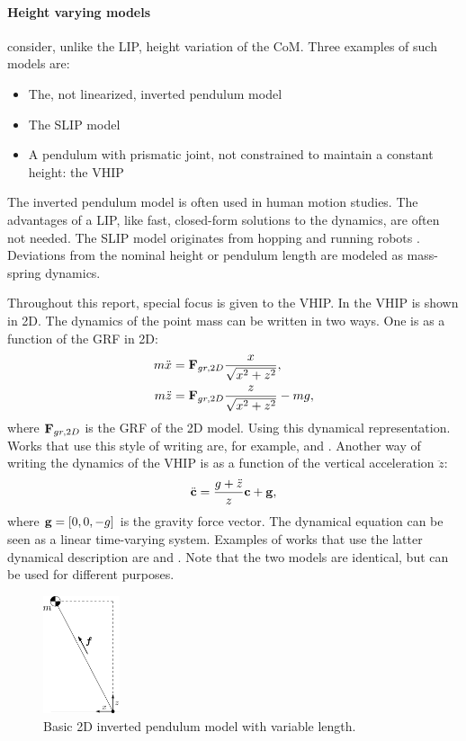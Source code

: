 \paragraph{Height varying models} consider, unlike the \ac{LIP}, height variation of the \ac{CoM}. Three examples of such models are:
\begin{itemize}
	\item The, not linearized, inverted pendulum model \cite{kuo2005energetic}
	\item The \ac{SLIP} model \cite{liu2015trajectory}
	\item A pendulum with prismatic joint, not constrained to maintain a constant height: the \ac{VHIP} \cite{pratt2007derivation}
\end{itemize}
The inverted pendulum model is often used in human motion studies. The advantages of a \ac{LIP}, like fast, closed-form solutions to the dynamics, are often not needed. The \ac{SLIP} model originates from hopping and running robots \cite{schwind1998spring}. Deviations from the nominal height or pendulum length are modeled as mass-spring dynamics. 

Throughout this report, special focus is given to the \ac{VHIP}. In  the \ac{VHIP} is shown in \ac{2D}. The dynamics of the point mass can be written in two ways. One is as a function of the \ac{GRF} in \ac{2D}:
\begin{align}
	m\ddot{x} &= \mathbf{F}_{gr,2D}\frac{x}{\sqrt{x^2 + z^2}},\\
	m\ddot{z} &= \mathbf{F}_{gr,2D}\frac{z}{\sqrt{x^2 + z^2}} - mg,
	\label{eq:dynamicsprattstyle}
\end{align}
where $\mathbf{F}_{gr,2D}$ is the \ac{GRF} of the \ac{2D}  model. Using this dynamical representation. Works that use this style of writing are, for example, \cite{pratt2007derivation} and \cite{koolen2016balance}.
Another way of writing the dynamics of the \ac{VHIP} is as a function of the vertical acceleration $\ddot{z}$:
\begin{equation}
	\ddot{\mathbf{c}} = \frac{g+\ddot{z}}{z}\mathbf{c} + \mathbf{g},
	\label{eq:dynamicscaronstyle}
\end{equation}
where $\mathbf{g}=[0,0,-g]$ is the gravity force vector. The dynamical equation can be seen as a linear time-varying system. Examples of works that use the latter dynamical description are \cite{hopkins2014humanoid} and \cite{caron2018balance}. Note that the two models are identical, but can be used for different purposes.
\begin{figure}[h]
\centering
\includegraphics[width=0.2\textwidth]{STYLESTUFF/2Dnonlin.png}
\caption{Basic \ac{2D} inverted pendulum model with variable length.}
\label{fig:2Dnonlinmodel}
\end{figure}

